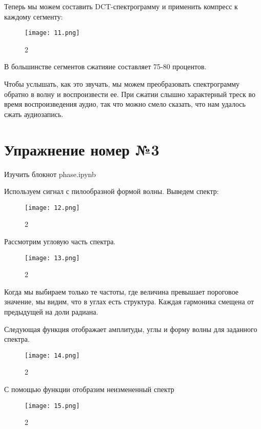 \documentclass[10pt,a4paper,oneside]{article}
\begin{document}
Теперь мы можем составить DCT-спектрограмму и применить компресс к каждому сегменту:

\begin{figure}[H]
        \centering
        \texttt{[image: 11.png]}
        \caption{2}
        \label{fig:first}
\end{figure}

В большинстве сегментов сжатияие составляет 75-80 процентов.

Чтобы услышать, как это звучать, мы можем преобразовать спектрограмму обратно в волну и воспроизвести ее. При сжатии слышно характерный треск во время воспроизведения аудио, так что можно смело сказать, что нам удалось сжать аудиозапись.

\section{Упражнение номер №3}

Изучить блокнот phase.ipynb

Используем сигнал с пилообразной формой волны. Выведем спектр: 

\begin{figure}[H]
        \centering
        \texttt{[image: 12.png]}
        \caption{2}
        \label{fig:first}
\end{figure}

Рассмотрим угловую часть спектра.

\begin{figure}[H]
        \centering
        \texttt{[image: 13.png]}
        \caption{2}
        \label{fig:first}
\end{figure}

Когда мы выбираем только те частоты, где величина превышает пороговое значение, мы видим, что в углах есть структура. Каждая гармоника смещена от предыдущей на доли радиана.

Следующая функция отображает амплитуды, углы и форму волны для заданного спектра.

\begin{figure}[H]
        \centering
        \texttt{[image: 14.png]}
        \caption{2}
        \label{fig:first}
\end{figure}

С помощью функции отобразим неизмененный спектр

\begin{figure}[H]
        \centering
        \texttt{[image: 15.png]}
        \caption{2}
        \label{fig:first}
\end{figure}
\end{document}
